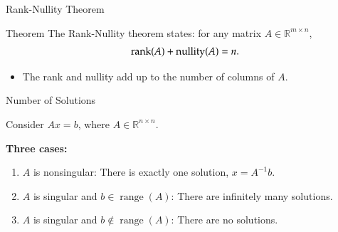 \documentclass[10pt]{beamer}
\begin{document}
\begin{frame}{Rank-Nullity Theorem}

\begin{block}{Theorem}
The Rank-Nullity theorem states: for any matrix $A\in\mathbb{R}^{m\times n}$,
\[
    \mathrm{rank}(A)+\operatorname{nullity}(A)=n.
\]
\end{block}


\begin{itemize}
    \item The rank and nullity add up to the number
    of columns of $A$.
\end{itemize}

\end{frame}

\begin{frame}{Number of Solutions}

Consider $Ax=b$, where $A\in\mathbb{R}^{n\times n}$.

\vfill 
\textbf{Three cases:}
\begin{enumerate}
    \item $A$ is nonsingular: There is exactly one solution,
    $x=A^{-1}b$.

    \item $A$ is singular and $b\in\operatorname{range}(A)$:
    There are infinitely many solutions.

    \item $A$ is singular and $b\notin\operatorname{range}(A)$:
    There are no solutions.
\end{enumerate}

\end{frame}
\end{document}
